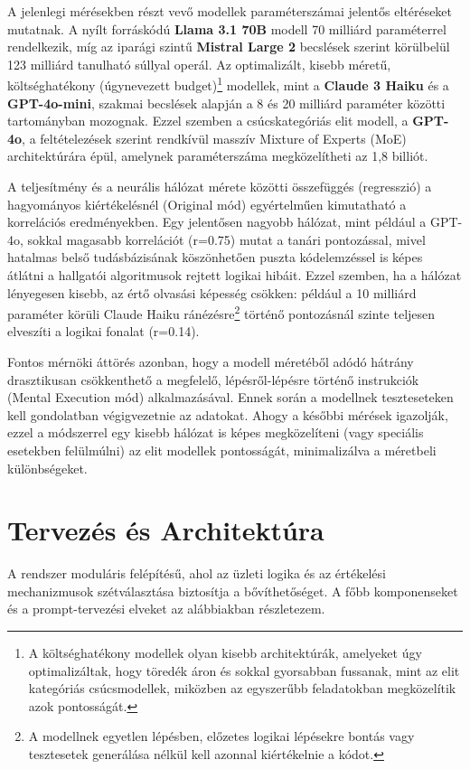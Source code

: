 \documentclass[12pt,a4paper]{article}
\begin{document}
A jelenlegi mérésekben részt vevő modellek paraméterszámai jelentős eltéréseket mutatnak. A nyílt forráskódú \textbf{Llama 3.1 70B} modell 70 milliárd paraméterrel rendelkezik, míg az iparági szintű \textbf{Mistral Large 2} becslések szerint körülbelül 123 milliárd tanulható súllyal operál. Az optimalizált, kisebb méretű, költséghatékony (úgynevezett budget)\footnote{A költséghatékony modellek olyan kisebb architektúrák, amelyeket úgy optimalizáltak, hogy töredék áron és sokkal gyorsabban fussanak, mint az elit kategóriás csúcsmodellek, miközben az egyszerűbb feladatokban megközelítik azok pontosságát.} modellek, mint a \textbf{Claude 3 Haiku} és a \textbf{GPT-4o-mini}, szakmai becslések alapján a 8 és 20 milliárd paraméter közötti tartományban mozognak. Ezzel szemben a csúcskategóriás elit modell, a \textbf{GPT-4o}, a feltételezések szerint rendkívül masszív Mixture of Experts (MoE) architektúrára épül, amelynek paraméterszáma megközelítheti az 1,8 billiót.

A teljesítmény és a neurális hálózat mérete közötti összefüggés (regresszió) a hagyományos kiértékelésnél (Original mód) egyértelműen kimutatható a korrelációs eredményekben. Egy jelentősen nagyobb hálózat, mint például a GPT-4o, sokkal magasabb korrelációt (r=0.75) mutat a tanári pontozással, mivel hatalmas belső tudásbázisának köszönhetően puszta kódelemzéssel is képes átlátni a hallgatói algoritmusok rejtett logikai hibáit. Ezzel szemben, ha a hálózat lényegesen kisebb, az értő olvasási képesség csökken: például a 10 milliárd paraméter körüli Claude Haiku ránézésre\footnote{A modellnek egyetlen lépésben, előzetes logikai lépésekre bontás vagy tesztesetek generálása nélkül kell azonnal kiértékelnie a kódot.} történő pontozásnál szinte teljesen elveszíti a logikai fonalat (r=0.14). 

Fontos mérnöki áttörés azonban, hogy a modell méretéből adódó hátrány drasztikusan csökkenthető a megfelelő, lépésről-lépésre történő instrukciók (Mental Execution mód) alkalmazásával. Ennek során a modellnek teszteseteken kell gondolatban végigvezetnie az adatokat. Ahogy a későbbi mérések igazolják, ezzel a módszerrel egy kisebb hálózat is képes megközelíteni (vagy speciális esetekben felülmúlni) az elit modellek pontosságát, minimalizálva a méretbeli különbségeket.

\section{Tervezés és Architektúra}
\label{sec:tervezes}
A rendszer moduláris felépítésű, ahol az üzleti logika és az értékelési mechanizmusok szétválasztása biztosítja a bővíthetőséget. A főbb komponenseket és a prompt-tervezési elveket az alábbiakban részletezem.
\end{document}
